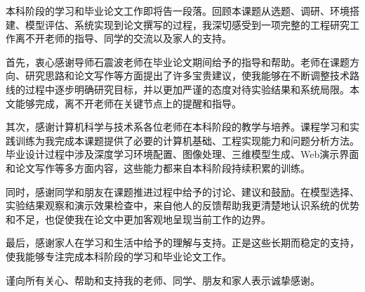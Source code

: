 
\begin{acknowledgements}

本科阶段的学习和毕业论文工作即将告一段落。回顾本课题从选题、调研、环境搭建、模型评估、系统实现到论文撰写的过程，我深切感受到一项完整的工程研究工作离不开老师的指导、同学的交流以及家人的支持。

首先，衷心感谢导师石震波老师在毕业论文期间给予的指导和帮助。老师在课题方向、研究思路和论文写作等方面提出了许多宝贵建议，使我能够在不断调整技术路线的过程中逐步明确研究目标，并以更加严谨的态度对待实验结果和系统局限。本文能够完成，离不开老师在关键节点上的提醒和指导。

其次，感谢计算机科学与技术系各位老师在本科阶段的教学与培养。课程学习和实践训练为我完成本课题提供了必要的计算机基础、工程实现能力和问题分析方法。毕业设计过程中涉及深度学习环境配置、图像处理、三维模型生成、Web演示界面和论文写作等多方面内容，这些能力都来自本科阶段持续积累的训练。

同时，感谢同学和朋友在课题推进过程中给予的讨论、建议和鼓励。在模型选择、实验结果观察和演示效果检查中，来自他人的反馈帮助我更清楚地认识系统的优势和不足，也促使我在论文中更加客观地呈现当前工作的边界。

最后，感谢家人在学习和生活中给予的理解与支持。正是这些长期而稳定的支持，使我能够专注完成本科阶段的学习和毕业论文工作。

谨向所有关心、帮助和支持我的老师、同学、朋友和家人表示诚挚感谢。

\end{acknowledgements}

